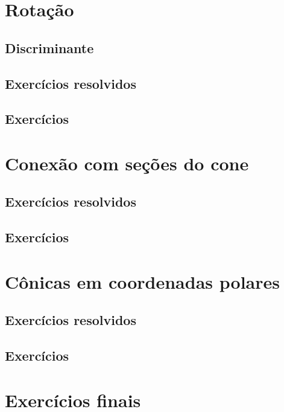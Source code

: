 \construirExer

\section{Rotação}
\construirSec

\subsection{Discriminante}
\construirSec

\subsection*{Exercícios resolvidos}
\construirExeresol

\subsection*{Exercícios}
\construirExer


\section{Conexão com seções do cone}
\construirSec

\subsection*{Exercícios resolvidos}
\construirExeresol


\subsection*{Exercícios}
\construirExer

\section{Cônicas em coordenadas polares}
\construirSec


\subsection*{Exercícios resolvidos}
\construirExeresol


\subsection*{Exercícios}
\construirExer


\section{Exercícios finais}
\construirExer

